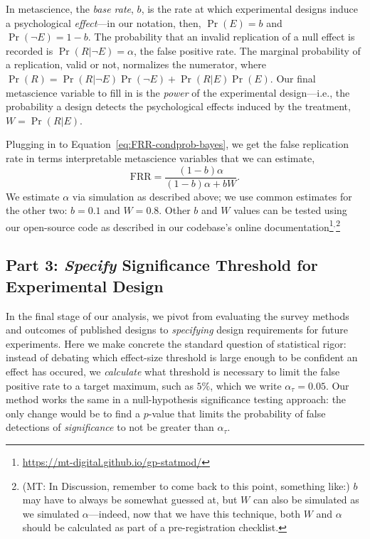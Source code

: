 \documentclass[preview]{article}
\newcommand{\mt}[1]{{\textcolor{myorange} {({\tiny MT:} #1)}}}
\begin{document}
In metascience, the \emph{base rate}, $b$, is the rate at which experimental
designs induce a psychological \emph{effect}—in our notation, then, $\Pr(E) =
b$ and $\Pr(\neg E) = 1 - b$. The probability that an invalid replication of
a null effect is recorded is $\Pr(R | \neg E) = \alpha$, the false positive
rate.  The marginal probability of a replication, valid or not, normalizes
the numerator, where $\Pr(R) = \Pr(R| \neg E)\Pr(\neg E) + \Pr(R|E)\Pr(E)$.
Our final metascience variable to fill in is the \emph{power} of the
experimental design—i.e., the probability a design detects the psychological
effects induced by the treatment, $W = \Pr(R|E)$.

Plugging in to Equation~\ref{eq:FRR-condprob-bayes}, we get the false
replication rate in terms interpretable metascience variables that we can
estimate, \begin{equation}
  \mathrm{FRR}= \frac{(1 - b)\alpha}{(1 - b)\alpha + bW}.
  \label{eq:FRR-metascience}
\end{equation}
\noindent
We estimate $\alpha$ via simulation as described above; we use common
estimates for the other two: $b=0.1$ and $W=0.8$. Other $b$ and $W$ 
values can be tested using our open-source code as described in our
codebase's online
documentation\footnote{\url{https://mt-digital.github.io/gp-statmod/}}$^,
$\footnote{\mt{In Discussion, remember to come back to this point, something
  like:} $b$ may have to
always be somewhat guessed at, but $W$ can also be simulated as we
simulated $\alpha$—indeed, now that we have this technique, both $W$ and
$\alpha$ should be calculated as part of a pre-registration checklist.}


\subsection{Part 3: \emph{Specify} Significance Threshold for Experimental Design}

In the final stage of our analysis, we pivot from evaluating the survey methods and
outcomes of published designs to \emph{specifying} design requirements
for future experiments. Here we make concrete
the standard question of statistical rigor: instead of debating which
effect-size threshold is large enough to be confident an effect has occured, 
we \emph{calculate} what threshold is necessary to
limit the false positive rate to a target maximum, such as $5\%$, which we
write $\alpha_\tau = 0.05$. Our method works the same in a null-hypothesis significance
testing approach: the only change would be to find a $p$-value that limits
the probability of false detections of \emph{significance} to not be greater
than $\alpha_\tau$.
\end{document}
